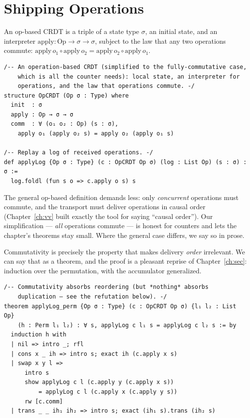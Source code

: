 \documentclass[12pt, a4paper, openright]{book}
\theoremstyle{thmstyle}
\theoremstyle{defstyle}
\newenvironment{defbox}[1][]{%
  \begin{tcolorbox}[defbox, title={Definition\ifx\\#1\\\else\ --- #1\fi}]%
}{\end{tcolorbox}}
\newenvironment{notebox}{%
  \begin{tcolorbox}[notebox]%
}{\end{tcolorbox}}
\newcounter{refutation}[chapter]
\begin{document}
\section{Shipping Operations}

\begin{defbox}[Op-based CRDT, fully-commutative case]
  An op-based CRDT is a triple of a state type $\sigma$, an initial
  state, and an interpreter $\mathrm{apply} : \mathrm{Op} \to \sigma \to
  \sigma$, subject to the law that any two operations commute:
  $\mathrm{apply}\,o_1 \circ \mathrm{apply}\,o_2 =
   \mathrm{apply}\,o_2 \circ \mathrm{apply}\,o_1$.
\end{defbox}

\begin{verbatim}
/-- An operation-based CRDT (simplified to the fully-commutative case,
    which is all the counter needs): local state, an interpreter for
    operations, and the law that operations commute. -/
structure OpCRDT (Op σ : Type) where
  init  : σ
  apply : Op → σ → σ
  comm  : ∀ (o₁ o₂ : Op) (s : σ),
    apply o₁ (apply o₂ s) = apply o₂ (apply o₁ s)

/-- Replay a log of received operations. -/
def applyLog {Op σ : Type} (c : OpCRDT Op σ) (log : List Op) (s : σ) : σ :=
  log.foldl (fun s o => c.apply o s) s
\end{verbatim}

\begin{notebox}
  The general op-based definition demands less: only \emph{concurrent}
  operations must commute, and the transport must deliver operations in
  causal order (Chapter~\ref{ch:vv} built exactly the tool for saying
  ``causal order''). Our simplification --- \emph{all} operations
  commute --- is honest for counters and lets the chapter's theorems
  stay small. Where the general case differs, we say so in prose.
\end{notebox}

Commutativity is precisely the property that makes delivery \emph{order}
irrelevant. We can say that as a theorem, and the proof is a pleasant
reprise of Chapter~\ref{ch:sec}: induction over the permutation, with
the accumulator generalized.

\begin{verbatim}
/-- Commutativity absorbs reordering (but *nothing* absorbs
    duplication — see the refutation below). -/
theorem applyLog_perm {Op σ : Type} (c : OpCRDT Op σ) {l₁ l₂ : List Op}
    (h : Perm l₁ l₂) : ∀ s, applyLog c l₁ s = applyLog c l₂ s := by
  induction h with
  | nil => intro _; rfl
  | cons x _ ih => intro s; exact ih (c.apply x s)
  | swap x y l =>
      intro s
      show applyLog c l (c.apply y (c.apply x s))
          = applyLog c l (c.apply x (c.apply y s))
      rw [c.comm]
  | trans _ _ ih₁ ih₂ => intro s; exact (ih₁ s).trans (ih₂ s)
\end{verbatim}
\end{document}

